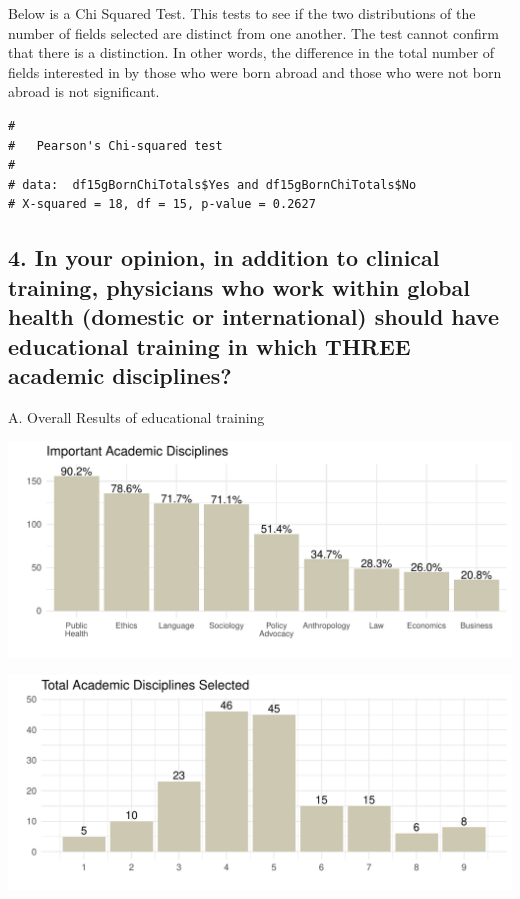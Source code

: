 \documentclass[
  letterpaper,
  DIV=11,
  numbers=noendperiod]{scrartcl}
\begin{document}
Below is a Chi Squared Test. This tests to see if the two distributions
of the number of fields selected are distinct from one another. The test
cannot confirm that there is a distinction. In other words, the
difference in the total number of fields interested in by those who were
born abroad and those who were not born abroad is not significant.

\begin{verbatim}
# 
#   Pearson's Chi-squared test
# 
# data:  df15gBornChiTotals$Yes and df15gBornChiTotals$No
# X-squared = 18, df = 15, p-value = 0.2627
\end{verbatim}

\newpage

\hypertarget{in-your-opinion-in-addition-to-clinical-training-physicians-who-work-within-global-health-domestic-or-international-should-have-educational-training-in-which-three-academic-disciplines}{%
\subsection{4. In your opinion, in addition to clinical training,
physicians who work within global health (domestic or international)
should have educational training in which THREE academic
disciplines?}\label{in-your-opinion-in-addition-to-clinical-training-physicians-who-work-within-global-health-domestic-or-international-should-have-educational-training-in-which-three-academic-disciplines}}

A. Overall Results of educational training

\includegraphics{GlobalHealthQuarto1-5_files/figure-pdf/unnamed-chunk-33-1.pdf}

\includegraphics{GlobalHealthQuarto1-5_files/figure-pdf/unnamed-chunk-34-1.pdf}
\end{document}
